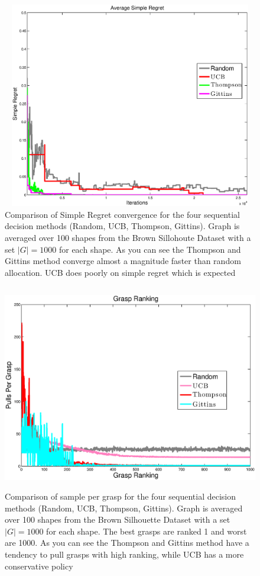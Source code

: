 \documentclass[letterpaper, 10 pt, conference]{ieeeconf}  %
\begin{document}
\begin{figure}[ht!]
\centering
\includegraphics[width = 16.5cm, height = 9cm]{matlab_figures/simple_regret.eps}
\caption{ \footnotesize Comparison of Simple Regret convergence for the four sequential decision methods (Random, UCB, Thompson, Gittins). Graph is averaged over 100 shapes from the Brown Sillohoute Dataset \cite{brown} with a set $|G|=1000$ for each shape. As you can see the Thompson and Gittins method converge almost a magnitude faster than random allocation. UCB does poorly on simple regret which is expected \cite{best_arm}}
\vspace*{-10pt}
\label{fig:simple_regret}
\end{figure}


\begin{figure}[ht!]
\centering
\includegraphics[width = 16.5cm, height = 9cm]{matlab_figures/pulls_per_grasp.eps}
\caption{ \footnotesize Comparison of sample per grasp for the four sequential decision methods (Random, UCB, Thompson, Gittins). Graph is averaged over 100 shapes from the Brown Silhouette Dataset \cite{brown} with a set $|G|=1000$ for each shape. The best grasps are ranked 1 and worst are 1000.  As you can see the Thompson and Gittins method have a tendency to pull grasps with high ranking, while UCB has a more conservative policy \cite{best_arm}}
\vspace*{-10pt}
\label{fig:pulls_per_grasp}
\end{figure}
\end{document}
